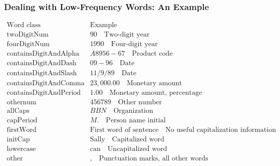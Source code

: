 \documentclass[handout]{beamer}
\begin{document}
\begin{frame}
  \frametitle{Dealing with Low-Frequency Words: An Example}
  \[
    \begin{array}{l|l}
      \text{Word class} & \text{Example} \\
      \hline
      \text{twoDigitNum} & 90 \quad \text{Two-digit year} \\
      \text{fourDigitNum} & 1990 \quad \text{Four-digit year} \\
      \text{containsDigitAndAlpha} & A8956-67 \quad \text{Product code} \\
      \text{containsDigitAndDash} & 09-96 \quad \text{Date} \\
      \text{containsDigitAndSlash} & 11/9/89 \quad \text{Date} \\
      \text{containsDigitAndComma} & 23,000.00 \quad \text{Monetary amount} \\
      \text{containsDigitAndPeriod} & 1.00 \quad \text{Monetary amount, percentage} \\
      \text{othernum} & 456789 \quad \text{Other number} \\
      \text{allCaps} & BBN \quad \text{Organization} \\
      \text{capPeriod} & M. \quad \text{Person name initial} \\
      \text{firstWord} & \text{First word of sentence} \quad \text{No useful capitalization information} \\
      \text{initCap} & \text{Sally} \quad \text{Capitalized word} \\
      \text{lowercase} & \text{can} \quad \text{Uncapitalized word} \\
      \text{other} & , \quad \text{Punctuation marks, all other words} \\
    \end{array}
  \]
\end{frame}
\end{document}

